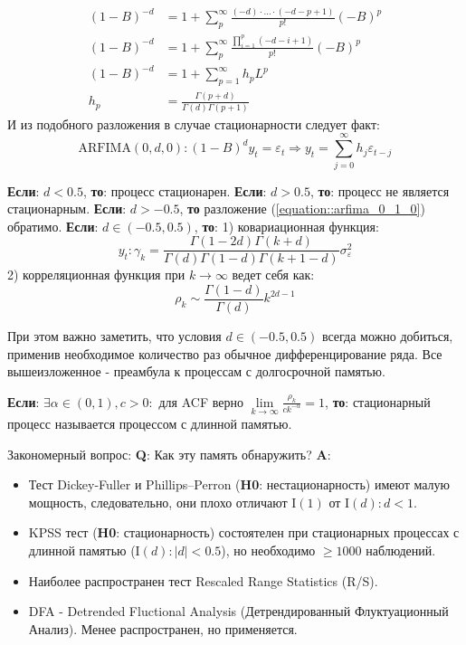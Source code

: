 \begin{equation}
	\begin{split}
		(1 - B)^{-d} & = 1 + \sum_{p}^{\infty} \frac{(-d)\cdot \ldots \cdot (-d -p + 1)}{p!} (-B)^{p}\\
		(1 - B)^{-d} & = 1 + \sum_{p}^{\infty} \frac{\prod_{i = 1}^{p}(-d - i + 1)}{p!} (-B)^{p}\\
		(1 - B)^{-d} & = 1 + \sum_{p = 1}^{\infty} h_pL^p\\
		h_p & = \frac{\Gamma(p + d)}{\Gamma(d)\Gamma(p + 1)}
	\end{split}
\end{equation}
И из подобного разложения \cite{quantil_2_2007} в случае стационарности следует факт:
\begin{equation} \label{equation::arfima_0_1_0}
	\text{ARFIMA}(0, d, 0): (1 - B)^d y_t = \varepsilon_{t} \Rightarrow y_t = \sum_{j = 0}^{\infty}h_j \varepsilon_{t - j}
\end{equation}
\begin{theorem}
	\textbf{Если}: $d < 0.5$, \textbf{то}: процесс стационарен. \textbf{Если}: $d > 0.5$, \textbf{то}: процесс не является стационарным. \textbf{Если}: $d > -0.5$, \textbf{то} разложение (\ref{equation::arfima_0_1_0}) обратимо. \textbf{Если}: $d \in (-0.5, 0.5)$, \textbf{то}: 1) ковариационная функция: $$y_t: \gamma_k = \frac{\Gamma(1 - 2d) \Gamma(k + d)}{\Gamma(d)\Gamma(1 - d)\Gamma(k + 1 - d)} \sigma^2_{\varepsilon}$$ 2) корреляционная функция при $k \to \infty$ ведет себя как: $$\rho_k \sim \frac{\Gamma(1 - d)}{\Gamma(d)}k^{2d - 1}$$
\end{theorem}
При этом важно заметить, что условия $d \in (-0.5, 0.5)$ всегда можно добиться, применив необходимое количество раз обычное дифференцирование ряда. Все вышеизложенное - преамбула к процессам с долгосрочной памятью.
\begin{definition}
	\textbf{Если}: $\exists \alpha \in (0, 1), c > 0:$ для ACF верно $\lim\limits_{k \to \infty} \frac{\rho_k}{ck^{-\alpha}} = 1$, \textbf{то}: стационарный процесс называется процессом с длинной памятью.
\end{definition}
Закономерный вопрос: \textbf{Q}: Как эту память обнаружить? \textbf{A}:
\begin{itemize}
	\item Тест Dickey-Fuller и Phillips–Perron (\textbf{H0}: нестационарность) имеют малую мощность, следовательно, они плохо отличают I$(1)$ от I$(d): d < 1$.
	\item KPSS тест (\textbf{H0}: стационарность) состоятелен при стационарных процессах с длинной памятью (I$(d): |d| < 0.5$), но необходимо $\ge 1000$ наблюдений.
	\item Наиболее распространен тест Rescaled Range Statistics (R/S). 
	\item DFA - Detrended Fluctional Analysis (Детрендированный Флуктуационный Анализ). Менее распространен, но применяется.
\end{itemize}
